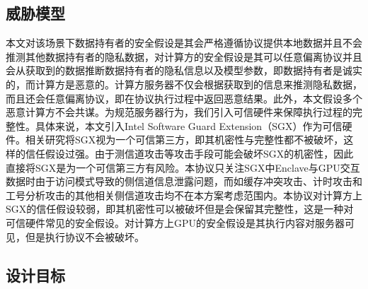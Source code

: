 \subsection{威胁模型}


本文对该场景下数据持有者的安全假设是其会严格遵循协议提供本地数据并且不会推测其他数据持有者的隐私数据，对计算方的安全假设是其可以任意偏离协议并且会从获取到的数据推断数据持有者的隐私信息以及模型参数，即数据持有者是诚实的，而计算方是恶意的。计算方服务器不仅会根据获取到的信息来推测隐私数据，而且还会任意偏离协议，即在协议执行过程中返回恶意结果。此外，本文假设多个恶意计算方不会共谋。为规范服务器行为，我们引入可信硬件来保障执行过程的完整性。具体来说，本文引入Intel Software Guard Extension（SGX）\cite{SGX_Explained}作为可信硬件。相关研究将SGX视为一个可信第三方，即其机密性与完整性都不被破坏，这样的信任假设过强。由于测信道攻击等攻击手段可能会破坏SGX的机密性\cite{SGX_Attack}，因此直接将SGX是为一个可信第三方有风险。本协议只关注SGX中Enclave与GPU交互数据时由于访问模式导致的侧信道信息泄露问题，而如缓存冲突攻击、计时攻击和工号分析攻击的其他相关侧信道攻击均不在本方案考虑范围内。本协议对计算方上SGX的信任假设较弱，即其机密性可以被破坏但是会保留其完整性，这是一种对可信硬件常见的安全假设\cite{Cryptflow}。对计算方上GPU的安全假设是其执行内容对服务器可见，但是执行协议不会被破坏。


\subsection{设计目标}

